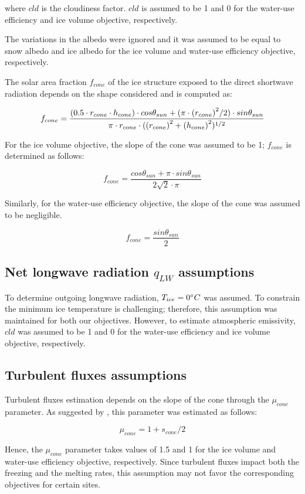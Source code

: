 where $cld$ is the cloudiness factor. $cld$ is assumed to be 1 and 0 for the water-use efficiency and ice volume
objective, respectively.

The variations in the albedo were ignored and it was assumed to be equal to snow albedo and ice albedo for the
ice volume and water-use efficiency objective, respectively.

The solar area fraction $f_{cone}$ of the ice structure exposed to the direct shortwave radiation depends on the
shape considered and is computed as:

\begin{equation}
		f_{cone} =\frac{(0.5 \cdot r_{cone} \cdot h_{cone}) \cdot cos \theta_{sun} +(\pi \cdot
			{(r_{cone})}^2/2) \cdot sin \theta_{sun} }{\pi \cdot r_{cone} \cdot ({(r_{cone})}^2+{(h_{cone})}^2)^{1/2}}\\
\end{equation}

For the ice volume objective, the slope of the cone was assumed to be 1; $f_{cone}$ is determined as follows:

\begin{equation}
		f_{cone} =\frac{ cos \theta_{sun} + \pi \cdot sin \theta_{sun} }{2\sqrt{2} \cdot \pi }
\end{equation}

Similarly, for the water-use efficiency objective, the slope of the cone was assumed to be negligible.

\begin{equation}
		f_{cone} =\frac{ sin \theta_{sun} }{2 }
\end{equation}

\subsection{Net longwave radiation \texorpdfstring{$q_{LW}$}{Lg} assumptions} 

To determine outgoing longwave radiation, $T_{ice} = 0 ^{\circ} C$ was assumed. To constrain the minimum ice
temperature is challenging; therefore, this assumption was maintained for both our objectives. However, to
estimate atmospheric emissivity, $cld$ was assumed to be 1 and 0 for the water-use efficiency and ice volume
objective, respectively.

\subsection{Turbulent fluxes assumptions} 

Turbulent fluxes estimation depends on the slope of the cone through the $\mu_{cone}$ parameter. As suggested 
by \citet{oerlemansBriefCommunicationGrowth2021}, this parameter was estimated as follows:

\begin{equation}
  \mu_{cone} =1 + s_{cone}/2
\end{equation}

Hence, the $\mu_{cone}$ parameter takes values of 1.5 and 1 for the ice volume and water-use efficiency
objective, respectively.  Since turbulent fluxes impact both the freezing and the melting rates, this assumption
may not favor the corresponding objectives for certain sites.

